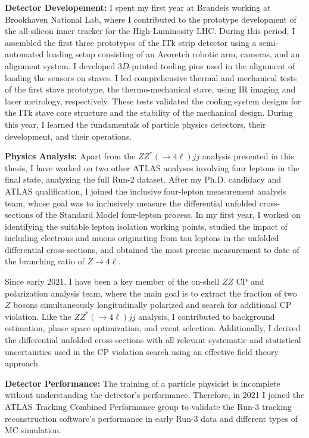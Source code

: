 \textbf{Detector Developement:}
I spent my first year at Brandeis working at Brookhaven National Lab, where I contributed to the prototype development of the all-silicon inner tracker for the High-Luminosity LHC. During this period, I assembled the first three prototypes of the ITk strip detector using a semi-automated loading setup consisting of an Aeoretch robotic arm, cameras, and an alignment system. I developed $3D$-printed tooling pins used in the alignment of loading the sensors on staves. I led comprehensive thermal and mechanical tests of the first stave prototype, the thermo-mechanical stave, using IR imaging and laser metrology, respectively. These tests validated the cooling system designs for the ITk stave core structure and the stability of the mechanical design. During this year, I learned the fundamentals of particle physics detectors, their development, and their operations.  

\textbf{Physics Analysis:}
Apart from the $ZZ^*(\rightarrow 4\ell)jj$ analysis presented in this thesis, I have worked on two other ATLAS analyses involving four leptons in the final state, analyzing the full Run-2 dataset. After my Ph.D. candidacy and ATLAS qualification, I joined the inclusive four-lepton measurement analysis team, whose goal was to inclusively measure the differential unfolded cross-sections of the Standard Model four-lepton process. In my first year, I worked on identifying the suitable lepton isolation working points, studied the impact of including electrons and muons originating from tau leptons in the unfolded differential cross-sections, and obtained the most precise measurement to date of the branching ratio of $ Z \to 4\ell$.

Since early 2021, I have been a key member of the on-shell $ZZ$ CP and polarization analysis team, where the main goal is to extract the fraction of two $Z$ bosons simultaneously longitudinally polarized and search for additional CP violation. Like the $ZZ^*(\rightarrow 4\ell)jj$ analysis, I contributed to background estimation, phase space optimization, and event selection. Additionally, I derived the differential unfolded cross-sections with all relevant systematic and statistical uncertainties used in the CP violation search using an effective field theory approach. 

\textbf{Detector Performance: }
The training of a particle physicist is incomplete without understanding the detector's performance. Therefore, in 2021 I joined the ATLAS Tracking Combined Performance group to validate the Run-3 tracking reconstruction software's performance in early Run-3 data and different types of MC simulation. 

